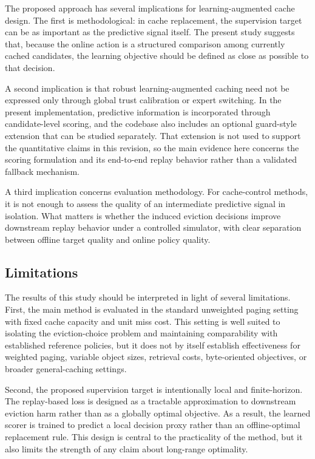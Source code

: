 \documentclass[preprint,12pt]{elsarticle}
\begin{document}
The proposed approach has several implications for learning-augmented cache design. The first is methodological: in cache replacement, the supervision target can be as important as the predictive signal itself. The present study suggests that, because the online action is a structured comparison among currently cached candidates, the learning objective should be defined as close as possible to that decision.

A second implication is that robust learning-augmented caching need not be expressed only through global trust calibration or expert switching. In the present implementation, predictive information is incorporated through candidate-level scoring, and the codebase also includes an optional guard-style extension that can be studied separately. That extension is not used to support the quantitative claims in this revision, so the main evidence here concerns the scoring formulation and its end-to-end replay behavior rather than a validated fallback mechanism.

A third implication concerns evaluation methodology. For cache-control methods, it is not enough to assess the quality of an intermediate predictive signal in isolation. What matters is whether the induced eviction decisions improve downstream replay behavior under a controlled simulator, with clear separation between offline target quality and online policy quality.
\subsection{Limitations}
\label{subsec:limitations}

The results of this study should be interpreted in light of several limitations. First, the main method is evaluated in the standard unweighted paging setting with fixed cache capacity and unit miss cost. This setting is well suited to isolating the eviction-choice problem and maintaining comparability with established reference policies, but it does not by itself establish effectiveness for weighted paging, variable object sizes, retrieval costs, byte-oriented objectives, or broader general-caching settings.

Second, the proposed supervision target is intentionally local and finite-horizon. The replay-based loss is designed as a tractable approximation to downstream eviction harm rather than as a globally optimal objective. As a result, the learned scorer is trained to predict a local decision proxy rather than an offline-optimal replacement rule. This design is central to the practicality of the method, but it also limits the strength of any claim about long-range optimality.
\end{document}
